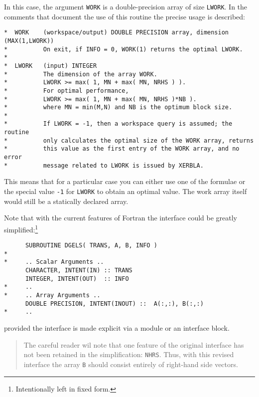 In this case, the argument \verb+WORK+ is a double-precision array of
size \verb+LWORK+. In the comments that document the use of this routine
the precise usage is described:
%
\begin{verbatim}
*  WORK    (workspace/output) DOUBLE PRECISION array, dimension (MAX(1,LWORK))
*          On exit, if INFO = 0, WORK(1) returns the optimal LWORK.
*
*  LWORK   (input) INTEGER
*          The dimension of the array WORK.
*          LWORK >= max( 1, MN + max( MN, NRHS ) ).
*          For optimal performance,
*          LWORK >= max( 1, MN + max( MN, NRHS )*NB ).
*          where MN = min(M,N) and NB is the optimum block size.
*
*          If LWORK = -1, then a workspace query is assumed; the routine
*          only calculates the optimal size of the WORK array, returns
*          this value as the first entry of the WORK array, and no error
*          message related to LWORK is issued by XERBLA.
\end{verbatim}

This means that for a particular case you can either use one of the formulae
or the special value \verb+-1+ for \verb+LWORK+ to obtain an optimal value.
The work array itself would still be a statically declared array.

Note that with the current features of Fortran the interface could be greatly
simplified:\footnote{Intentionally left in fixed form.}
%
\begin{verbatim}
      SUBROUTINE DGELS( TRANS, A, B, INFO )
*
*     .. Scalar Arguments ..
      CHARACTER, INTENT(IN) :: TRANS
      INTEGER, INTENT(OUT)  :: INFO
*     ..
*     .. Array Arguments ..
      DOUBLE PRECISION, INTENT(INOUT) ::  A(:,:), B(:,:)
*     ..
\end{verbatim}
%
\noindent provided the interface is made explicit via a module or an interface block.

\begin{quote}
The careful reader wil note that one feature of the original interface
has not been retained in the simplification: \verb+NHRS+. Thus, with this
revised interface the array \verb+B+ should consist entirely of right-hand
side vectors.
\end{quote}
